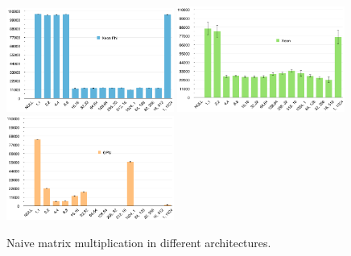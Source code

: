 \begin{figure}[!h]
    \centering
    \includegraphics[width=0.49\textwidth]{figures/naive_phi.png}
    \includegraphics[width=0.49\textwidth]{figures/naive_cpu.png}
    \includegraphics[width=0.49\textwidth]{figures/naive_gpu.png}
    \caption{Naive matrix multiplication in different architectures.}
    \label{Naive}
\end{figure}


